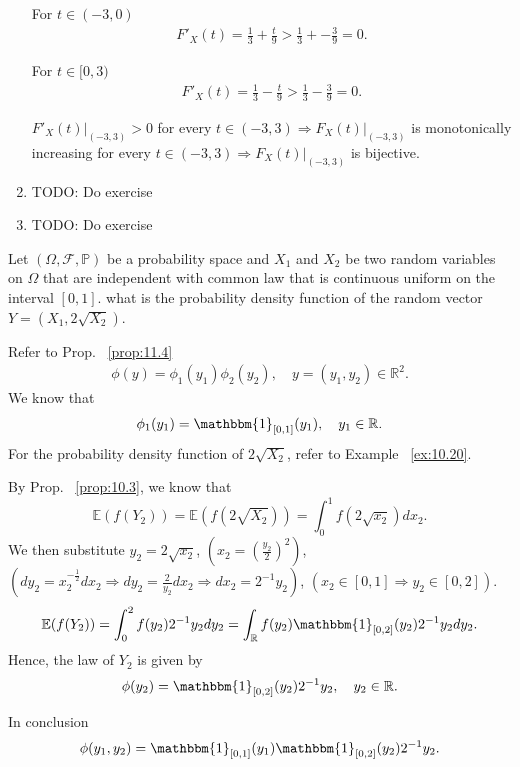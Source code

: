 \begin{exercise}[]
\begin{enumerate}[label=(\alph*), start=2]
            For $t \in (-3, 0) $
            \begin{align*}
                F'_X(t) = \frac{1}{3} + \frac{t}{9} > \frac{1}{3} + -\frac{3}{9} = 0
            .\end{align*}

            For $t \in [0, 3) $
            \begin{align*}
                F'_X(t) = \frac{1}{3} - \frac{t}{9} > \frac{1}{3} - \frac{3}{9} = 0
            .\end{align*}

            $F'_X(t)|_{(-3,3)} > 0 $ for every
            $ t \in (-3, 3) \Rightarrow F_X(t)|_{(-3,3)}$
            is monotonically increasing for every $t \in (-3, 3) \Rightarrow F_X(t)|_{(-3,3)}$
            is bijective.
        \item
          TODO: Do exercise
        \item
          TODO: Do exercise
    \end{enumerate}
\end{exercise}

\begin{exercise}[]
    \label{ex:12.4}
    Let $(\Omega, \mathcal{F}, \mathbb{P})$ be a probability space and $X_1 $ and $X_2 $ be two
    random variables on $\Omega$ that are independent with common law that is continuous uniform
    on the interval $\left[ 0,1 \right]  $. what is the probability density function of the
    random vector $Y=(X_1, 2\sqrt{X_2} ) $.

    Refer to Prop. ~\ref{prop:11.4}
    \begin{align*}
      \phi(y) = \phi_1(y_1)\phi_2(y_2), \quad y = (y_1, y_2) \in \mathbb{R}^{2}
    .\end{align*}
    We know that 
    \begin{align*}
      \phi_1(y_1)= \mathbbm{1}_{[0,1]}(y_1), \quad y_1 \in \mathbb{R} 
    .\end{align*}
    For the probability density function of $2\sqrt{X_2}  $, refer to Example ~\ref{ex:10.20}.
    
    By Prop. ~\ref{prop:10.3}, we know that 
    \[
      \mathbb{E}(f(Y_2)) = \mathbb{E}(f(2\sqrt{X_2} )) 
      = \int_{0}^{1} f(2\sqrt{x_2})dx_2.
    \] 
    We then substitute $y_2 = 2\sqrt{x_2} $,  $\left( x_2 = \left( \frac{y_2}{2} \right)^2  \right)$,
    $\left( dy_2 = x_2^{-\frac{1}{2}} dx_2 
    \Rightarrow dy_2 = \frac{2}{y_2}dx_2 \Rightarrow dx_2 = 2^{-1}y_2\right)  $,
    $\left( x_2 \in \left[ 0,1 \right]
    \Rightarrow y_2 \in \left[ 0,2 \right]  \right)  $.
    \[
    \mathbb{E}(f(Y_2)) = \int_{0}^{2} f(y_2)2^{-1}y_2dy_2 = \int_{\mathbb{R}} f(y_2)\mathbbm{1}_{[0,2]}(y_2)2^{-1}y_2dy_2
    .\] 
    Hence, the law of $Y_2 $ is given by
    \[
    \phi(y_2) = \mathbbm{1}_{[0,2]}(y_2)2^{-1}y_2, \quad y_2 \in \mathbb{R}
    .\] 

    In conclusion
    \[
      \phi(y_1, y_2) = \mathbbm{1}_{\left[ 0,1 \right] }(y_1) \mathbbm{1}_{\left[ 0,2 \right] }(y_2) 2^{-1}y_2 
    .\] 
\end{exercise}

